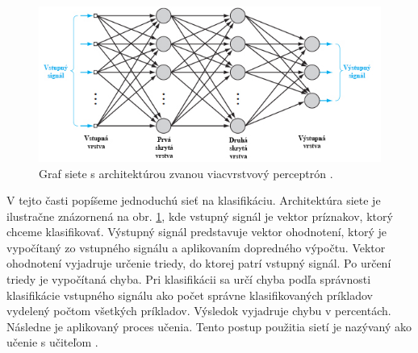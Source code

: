 \begin{figure}[H]
	\begin{center}
		\includegraphics[width=\textwidth]{images/11NN.jpg}
		\caption{Graf siete s architektúrou zvanou viacvrstvový perceptrón \cite{haykin2009neural}. }
		\label{img:11NN}
	\end{center}
\end{figure}

V tejto časti popíšeme jednoduchú sieť na klasifikáciu. Architektúra siete je ilustračne znázornená na obr. \ref{img:11NN}, kde vstupný signál je vektor príznakov, ktorý chceme klasifikovať. Výstupný signál predstavuje vektor ohodnotení, ktorý je vypočítaný zo vstupného signálu a aplikovaním dopredného výpočtu. Vektor ohodnotení vyjadruje určenie triedy, do ktorej patrí vstupný signál. Po určení triedy je vypočítaná chyba. Pri klasifikácii sa určí chyba podľa správnosti klasifikácie vstupného signálu ako počet správne klasifikovaných príkladov vydelený počtom všetkých príkladov. Výsledok vyjadruje chybu v percentách. Následne je aplikovaný proces učenia. Tento postup použitia sietí je nazývaný ako učenie s učiteľom \cite{haykin2009neural}.

